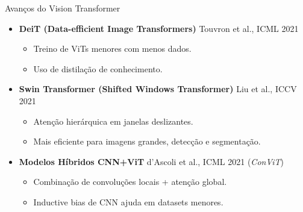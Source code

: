 \documentclass{beamer}
\begin{document}
\begin{frame}{Avanços do Vision Transformer}
\begin{itemize}
    \item \textbf{DeiT (Data-efficient Image Transformers)}  
    Touvron et al., ICML 2021  
    \begin{itemize}
        \item Treino de ViTs menores com menos dados.
        \item Uso de distilação de conhecimento.
    \end{itemize}

    \vspace{0.2cm}

    \item \textbf{Swin Transformer (Shifted Windows Transformer)}  
    Liu et al., ICCV 2021  
    \begin{itemize}
        \item Atenção hierárquica em janelas deslizantes.
        \item Mais eficiente para imagens grandes, detecção e segmentação.
    \end{itemize}

    \vspace{0.2cm}

    \item \textbf{Modelos Híbridos CNN+ViT}  
    d’Ascoli et al., ICML 2021 (\textit{ConViT})  
    \begin{itemize}
        \item Combinação de convoluções locais + atenção global.
        \item Inductive bias de CNN ajuda em datasets menores.
    \end{itemize}
\end{itemize}
\end{frame}
\end{document}

